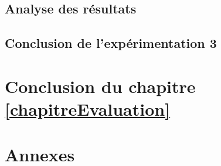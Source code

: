 \documentclass[onecolumn, 12pt]{book}
\begin{document}
	\subsection{Analyse des r\'esultats}
		
	\subsection{Conclusion de l'exp\'erimentation 3}
		

	\section{Conclusion du chapitre \ref{chapitreEvaluation}}
		

\section{Annexes}
	
\end{document}
